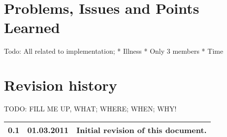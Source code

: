 \documentclass[titlepage,a4paper,11pt]{article}
\begin{document}
\section{Problems, Issues and Points Learned}
\newpage
	Todo: All related to implementation; 
	* Illness
	* Only 3 members
	* Time
	
	
\section{Revision history}

TODO: FILL ME UP, WHAT; WHERE; WHEN; WHY!

\begin{table}[H]
  \begin{tabular}{| c | c | c |}
    \hline
    0.1 & 01.03.2011 & Initial revision of this document. \\
    \hline
  \end{tabular}
\end{table}
\end{document}
